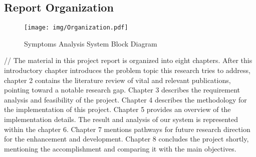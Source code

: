 
\subsection{Report Organization}
\begin{figure}[H]
\centering
\texttt{[image: img/Organization.pdf]}
\caption[Symptoms Analysis System Block Diagram]{Symptoms Analysis System Block Diagram}
\label{fig:System block diagram}
\end{figure}

//
The material in this project report is organized into eight chapters. After this introductory chapter introduces the problem topic this research tries to address, chapter 2 contains the literature review of vital and relevant publications, pointing toward a notable research gap. Chapter 3 describes the requirement analysis and feasibility of the project. Chapter 4 describes the methodology for the implementation of this project. Chapter 5 provides an overview of the implementation details. The result and analysis of our system is represented within the chapter 6. Chapter 7 mentions pathways for future research direction for the enhancement and development. Chapter 8 concludes the project shortly, mentioning the accomplishment and comparing it with the main objectives.


